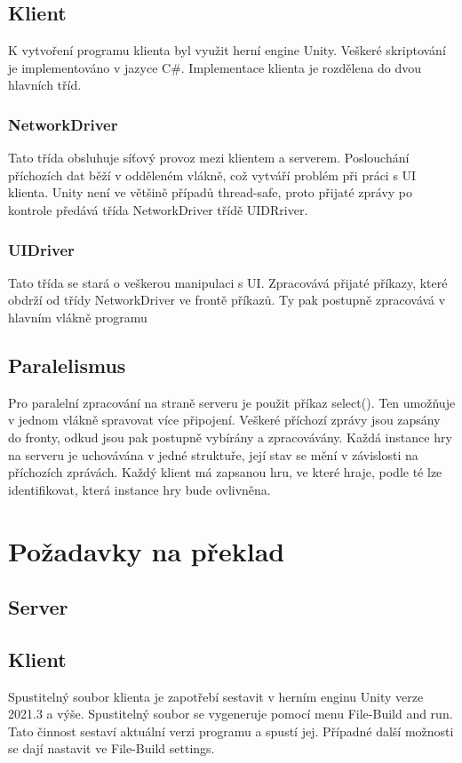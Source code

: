 \documentclass[12pt]{article}
\begin{document}
\subsection{Klient}
K vytvoření programu klienta byl využit herní engine Unity. Veškeré skriptování je implementováno v jazyce C\#. Implementace klienta je rozdělena do dvou hlavních tříd.
\subsubsection{NetworkDriver}
Tato třída obsluhuje síťový provoz mezi klientem a serverem. Poslouchání příchozích dat běží v odděleném vlákně, což vytváří problém při práci s UI klienta. Unity není ve většině případů thread-safe, proto přijaté zprávy po kontrole předává třída NetworkDriver třídě UIDRriver.
\subsubsection{UIDriver}
Tato třída se stará o veškerou manipulaci s UI. Zpracovává přijaté příkazy, které obdrží od třídy NetworkDriver ve frontě příkazů. Ty pak postupně zpracovává v hlavním vlákně programu

\subsection{Paralelismus}
Pro paralelní zpracování na straně serveru je použit příkaz select(). Ten umožňuje v jednom vlákně spravovat více připojení. Veškeré příchozí zprávy jsou zapsány do fronty, odkud jsou pak postupně vybírány a zpracovávány. Každá instance hry na serveru je uchovávána v jedné struktuře, její stav se mění v závislosti na příchozích zprávách. Každý klient má zapsanou hru, ve které hraje, podle té lze identifikovat, která instance hry bude ovlivněna. 

\newpage
\section{Požadavky na překlad}
\subsection{Server}

\subsection{Klient}
Spustitelný soubor klienta je zapotřebí sestavit v herním enginu Unity verze 2021.3 a výše. Spustitelný soubor se vygeneruje pomocí menu File-Build and run. Tato činnost sestaví aktuální verzi programu a spustí jej. Případné další možnosti se dají nastavit ve File-Build settings.
\end{document}
